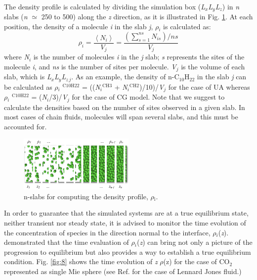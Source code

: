 \documentclass[9pt,bestpractices]{livecoms}
\begin{document}
The density profile is calculated by dividing the simulation box
(\textit{L}$_{x}$\textit{L}$_{y}$\textit{L}$_{z}$) in \textit{n} slabs
(\textit{n} ${\simeq}$ 250 to 500) along the \textit{z} direction, as it is
illustrated in Fig. \ref{fig:7}. At each position, the density of a molecule
\textit{i} in the slab \textit{j}, {${\rho}$}$_{i}$  is calculated as:
\begin{equation}
\rho_{i}=\frac{\left\langle N_{i}\right\rangle }{V_{j}}=\frac{\left(\sum_{s=1}^{ns}N_{is}\right)/ns}{V_{j}}
\end{equation}
where \textit{N}$_{i}$ is the number of molecules \textit{i} in the \textit{j}
slab; \textit{s} represents the sites of the molecule \textit{i}, and
\textit{ns} is the number of sites per molecule. \textit{V}$_{j}$ is the volume of each
slab, which is \textit{L}$_{x}$\textit{L}$_{y}$\textit{L}$_{z\,j}$. As an
example, the density of n-C$_{10}$H$_{22}$ in the slab \textit{j} can be
calculated as {${\rho}$}$_{i}$ $^{\mathrm{C10H22}}$
= ((\textit{N}$_{i}$$^{\mathrm{CH3}}$
+ \textit{N}$_{i}$$^{\mathrm{CH2}}$)/10)/\textit{V}$_{j}$ for the case of UA
whereas {${\rho}$}$_{i}$ $^{\mathrm{C10H22}}$
= (\textit{N}$_{i}$/3)/\textit{V}$_{j}$ for the case of CG model.
Note that we suggest to calculate the densities based on the number of sites observed
in a given slab. In most cases of chain fluids, molecules will span several slabs,
and this must be accounted for.

\begin{figure}
\includegraphics[width=0.5\textwidth]{gfx/image51.png}
\caption{n-slabs for computing the density profile, ${\rho}$$_{\mathrm{i}}$.}
\label{fig:7}
\end{figure}

In order to guarantee that the simulated systems are at a true equilibrium
state, neither transient nor steady state, it is advised to monitor the time
evolution of the concentration of species in the direction normal to the
interface, {${\rho}$}$_{i}$(\textit{z}). \citet{holcomb1993} demonstrated that the time evaluation of
{${\rho}$}$_{i}$(\textit{z}) can bring not only a picture of the progression to
equilibrium but also provides a way to establish a true equilibrium condition.
Fig. \ref{fig:8} shows the time evolution of \textit{z} \textendash{} {${\rho}$}(z)
for the case of CO$_{2}$ represented as single Mie sphere (see Ref. \citep{mejia2005} for the case of
Lennard \textendash{} Jones fluid.) 
\end{document}
